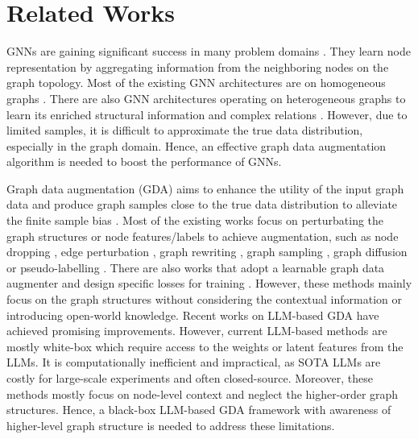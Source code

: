 \section{Related Works}

GNNs are gaining significant success in many problem domains \cite{kojima2020kgcn, hu2020HGT, liu2020hsgnn, chan2023SUMSHINE2, simonovsky2018graphvae, wu2020graph}.
%
They learn node representation by aggregating information from the neighboring nodes on the graph topology. 
%
Most of the existing GNN architectures are on homogeneous graphs \citep{kipf2016gcn, velivckovic2017GAT, xu2018GIN, yun2019GTN}.
%
There are also GNN architectures  operating on heterogeneous graphs to learn its enriched structural information and complex relations
\citep{wang2019HAN, hu2020HGT,huang2020dahgt, yang2020MuSDAC, schlichtkrull2018RGCN} .
%
However, due to limited samples, it is difficult to approximate the true data distribution, especially in the graph domain.
%
Hence, an effective graph data augmentation algorithm is needed to boost the performance of GNNs.

Graph data augmentation (GDA) aims to enhance the utility of the input graph data and produce graph samples close to the true data distribution to alleviate the finite sample bias \cite{ding2022GDAsurvey}.
%
Most of the existing works focus on perturbating the graph structures or node features/labels to achieve augmentation,
such as node dropping \cite{feng2020dropnode}, edge perturbation \citep{rong2019dropedge, velivckovic2018DGinfomax}, graph rewriting \cite{wang2020nodeaug, yang2019topology, franceschi2019learning}, graph sampling \cite{hamilton2017graphSAGE, hamilton2017inductive, qiu2020gcc}, graph diffusion \cite{topping2021understanding, zheng2020robust, qiu2020gcc, park2021metropolis} or pseudo-labelling \cite{zhang2017mixup}.
%
There are also works that adopt a learnable graph data augmenter and design specific losses for training \cite{you2020does, wu2020graph, liu2022local, suresh2021AD-GCL, li2018deeper, park2022graph}.
%
However, these methods mainly focus on the graph structures without considering the contextual information or introducing open-world knowledge.
%
Recent works \cite{jiang2023graphcare, he2023harnessing, west2021symbolic, zhang2022greaselm, wei2024llmrec, tang2024graphgpt} on LLM-based GDA have achieved promising improvements. However, current LLM-based methods are mostly white-box which require access to the weights or latent features from the LLMs. It is computationally inefficient and impractical, as SOTA LLMs are costly for large-scale experiments and often closed-source.
%
Moreover, these methods mostly focus on node-level context and neglect the higher-order graph structures.
%
Hence, a black-box LLM-based GDA framework with awareness of higher-level graph structure is needed to address these limitations.
%


